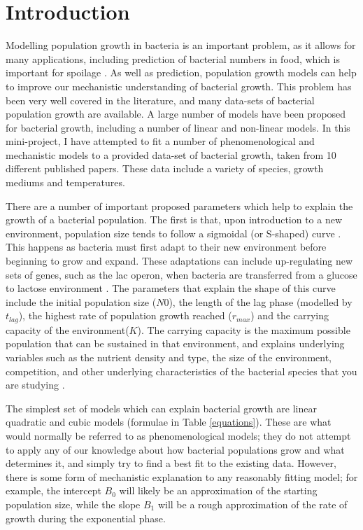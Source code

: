 \documentclass[11pt,a4wide,titlepage]{article}
\begin{document}
\section*{Introduction}
Modelling population growth in bacteria is an important problem, as it allows for many applications, including prediction of bacterial numbers in food, which is important for spoilage \citep{pelegMicrobialGrowthCurves2011}. As well as prediction, population growth models can help to improve our mechanistic understanding of bacterial growth. This problem has been very well covered in the literature, and many data-sets of bacterial population growth are available. A large number of models have been proposed for bacterial growth, including a number of linear and non-linear models. In this mini-project, I have attempted to fit a number of phenomenological and mechanistic models to a provided data-set of bacterial growth, taken from 10 different published papers. These data include a variety of species, growth mediums and temperatures.

There are a number of important proposed parameters which help to explain the growth of a bacterial population. The first is that, upon introduction to a new environment, population size tends to follow a sigmoidal (or S-shaped) curve \citep{zwieteringModelingBacterialGrowth1990}. This happens as bacteria must first adapt to their new environment before beginning to grow and expand. These adaptations can include up-regulating new sets of genes, such as the lac operon, when bacteria are transferred from a glucose to lactose environment \citep{buchananWhenSimpleGood1997}. The parameters that explain the shape of this curve include the initial population size ($N0$), the length of the lag phase (modelled by $t_{lag}$), the highest rate of population growth reached ($r_{max}$) and the carrying capacity  of the environment($K$). The carrying capacity is the maximum possible population that can be sustained in that environment, and explains underlying variables such as the nutrient density and type, the size of the environment, competition, and other underlying characteristics of the bacterial species that you are studying \citep{bernhardtMetabolicTheoryTemperatureSize2018}.

The simplest set of models which can explain bacterial growth are linear quadratic and cubic models (formulae in Table \ref{equations}). These are what would normally be referred to as phenomenological models; they do not attempt to apply any of our knowledge about how bacterial populations grow and what determines it, and simply try to find a best fit to the existing data. However, there is some form of mechanistic explanation to any reasonably fitting model; for example, the intercept $B_0$ will likely be an approximation of the starting population size, while the slope $B_1$ will be a rough approximation of the rate of growth during the exponential phase.
\end{document}
